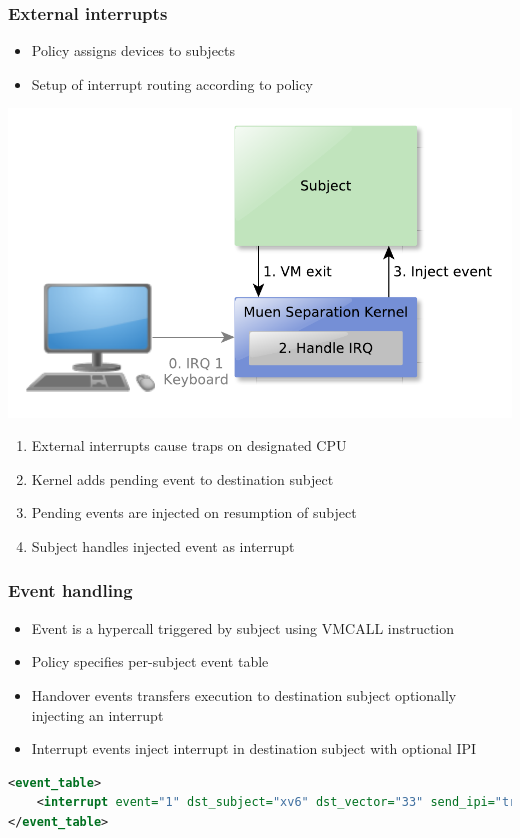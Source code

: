 \documentclass[xcolor={dvipsnames}]{beamer}
\begin{document}
\begin{frame}\frametitle{External interrupts}
\begin{itemize}
	\item Policy assigns devices to subjects
	\item Setup of interrupt routing according to policy
\end{itemize}
\begin{center}
	\includegraphics[scale=0.41]{images/external-interrupt.pdf}
\end{center}
\begin{enumerate}
	\item External interrupts cause traps on designated CPU
	\item Kernel adds pending event to destination subject
	\item Pending events are injected on resumption of subject
	\item Subject handles injected event as interrupt
\end{enumerate}
\end{frame}

\begin{frame}[fragile]\frametitle{Event handling}
\begin{itemize}
	\item Event is a hypercall triggered by subject using VMCALL instruction
	\item Policy specifies per-subject event table
	\item Handover events transfers execution to destination subject optionally injecting an interrupt
	\item Interrupt events inject interrupt in destination subject with optional IPI
\end{itemize}
\begin{lstlisting}[language=xml]
<event_table>
    <interrupt event="1" dst_subject="xv6" dst_vector="33" send_ipi="true"/>
</event_table>
\end{lstlisting}
\end{frame}
\end{document}
